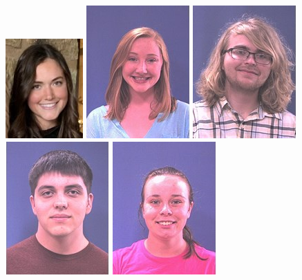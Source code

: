 \documentclass[xcolor={usenames,dvipsnames,svgnames,table},12pt]{beamer}
\begin{document}
\begin{frame}{}
\begin{center}
\includegraphics[width=\photosize]{S21/000572599.jpg}
\includegraphics[width=\photosize]{S21/000570543.jpg}
\includegraphics[width=\photosize]{S21/000567754.jpg}
\includegraphics[width=\photosize]{S21/000569572.jpg}
\includegraphics[width=\photosize]{S21/000571405.jpg}

\end{center}
\end{frame}
\end{document}
